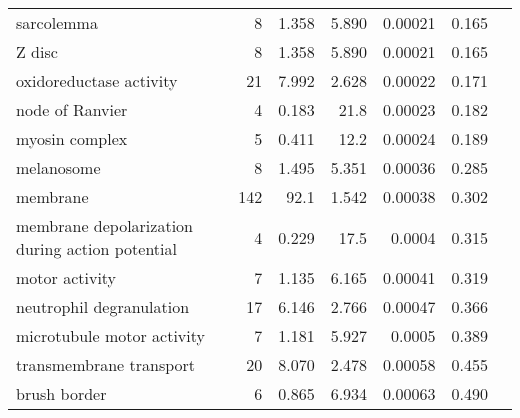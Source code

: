 \begin{longtable}{|l|r|r|r|r|r|}
                                        sarcolemma &                       8 &                   1.358 &      5.890 &              0.00021 &                        0.165~~ \\
                                            Z disc &                       8 &                   1.358 &      5.890 &              0.00021 &                        0.165~~ \\
                           oxidoreductase activity &                      21 &                   7.992 &      2.628 &              0.00022 &                        0.171~~ \\
                                   node of Ranvier &                       4 &                   0.183 &       21.8 &              0.00023 &                        0.182~~ \\
                                    myosin complex &                       5 &                   0.411 &       12.2 &              0.00024 &                        0.189~~ \\
                                        melanosome &                       8 &                   1.495 &      5.351 &              0.00036 &                        0.285~~ \\
                                          membrane &                     142 &                    92.1 &      1.542 &              0.00038 &                        0.302~~ \\
   membrane depolarization during action potential &                       4 &                   0.229 &       17.5 &               0.0004 &                        0.315~~ \\
                                    motor activity &                       7 &                   1.135 &      6.165 &              0.00041 &                        0.319~~ \\
                          neutrophil degranulation &                      17 &                   6.146 &      2.766 &              0.00047 &                        0.366~~ \\
                        microtubule motor activity &                       7 &                   1.181 &      5.927 &               0.0005 &                        0.389~~ \\
                           transmembrane transport &                      20 &                   8.070 &      2.478 &              0.00058 &                        0.455~~ \\
                                      brush border &                       6 &                   0.865 &      6.934 &              0.00063 &                        0.490~~ \\

\end{longtable}
